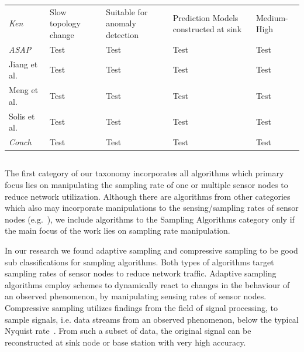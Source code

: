 \begin{table}[h]
\begin{tabular} { |p{3.5cm}||p{3cm}|p{3cm}|p{3cm}|p{2.5cm}| }
        \textit{Ken}~\cite{chu2006approximate}& Slow topology
        change~\cite{gedik2007asap} & Suitable for anomaly detection &
        Prediction Models constructed at sink~\cite{gedik2007asap}  &
        Medium-High~\cite{gedik2007asap}\\

        \textit{ASAP}~\cite{gedik2007asap}& Test & Test & Test & Test\\

        Jiang et al.~\cite{jiang2011prediction}& Test & Test & Test & Test\\
        Meng et al.~\cite{meng2004event}& Test & Test & Test & Test\\
        Solis et al.~\cite{solis2005efficient}& Test & Test & Test & Test\\
        \textit{Conch}~\cite{silberstein2006constraint}& Test & Test & Test & Test\\
        \hline
        \end{tabular}
\end{table}

\FloatBarrier


\subsection{\catI} %
\label{sec:catI}

The first category of our taxonomy incorporates all algorithms which primary
focus lies on manipulating the sampling rate of one or multiple sensor nodes to
reduce network utilization. Although there are algorithms from other categories
which also may incorporate manipulations to the sensing/sampling rates of
sensor nodes (e.g.~\cite{trihinas2015adam, chatterjea2008adaptive}), we include
algorithms to the Sampling Algorithms category only if the main focus of the
work lies on sampling rate manipulation. 


In our research we found adaptive sampling and compressive sampling to be good
sub classifications for sampling algorithms. Both types of algorithms target
sampling rates of sensor nodes to reduce network traffic. Adaptive sampling
algorithms employ schemes to dynamically react to changes in the behaviour of
an observed phenomenon, by manipulating sensing rates of sensor nodes.
Compressive sampling utilizes findings from the field of signal processing, to
sample signals, i.e. data streams from an observed phenomenon, below the
typical Nyquist rate~\cite{candes2008introduction}. From such a subset of data,
the original signal can be reconstructed at sink node or base station with very
high accuracy.

